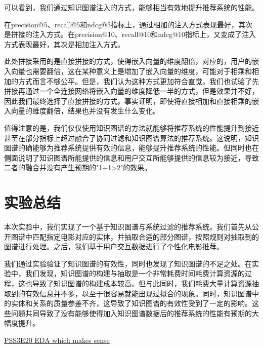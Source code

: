 \documentclass{ctexart}
\begin{document}
\begin{sloppypar}
可以看到，我们通过知识图谱注入的方式，能够相当有效地提升推荐系统的性能。

在precision@5、recall@5和ndcg@5指标上，通过相加的注入方式表现最好，其次是拼接的注入方式。在precision@10、recall@10和ndcg@10指标上，又变成了注入方式表现最好，其次是相加注入方式。

此处拼接采用的是直接拼接的方式，使得嵌入向量的维度翻倍，对应的，用户的嵌入向量也需要翻倍，这在某种意义上是增加了嵌入向量的维度，可能对于相乘和相加的方式而言不够公平。但是，我们认为这种方式更加符合直觉。我们也试验了先拼接再通过一个全连接网络将嵌入向量的维度降低一半的方式，但是效果并不好，因此我们最终选择了直接拼接的方式。事实证明，即使将直接相加和直接相乘的嵌入向量的维度翻倍，结果也并没有发生什么变化。

值得注意的是，我们仅仅使用知识图谱的方法就能够将推荐系统的性能提升到接近甚至在部分指标上超过融合了协同过滤和知识图谱算法的推荐系统。这说明，知识图谱的确能够为推荐系统提供有效的信息，能够提升推荐系统的性能。但同时也在侧面说明了知识图谱所能提供的信息和用户交互所能够提供的信息较为接近，导致二者的融合并没有产生预期的"1+1>2"的效果。

\section{实验总结}
    本次实验中，我们实现了一个基于知识图谱与系统过滤的推荐系统。我们首先从公开图谱中匹配指定电影对应的实体，并抽取合适的部分图谱，按照规则对抽取到的图谱进行处理。之后，我们基于用户交互数据进行了个性化电影推荐。

    我们通过实验验证了知识图谱的有效性，同时也发现了知识图谱的不足之处。在实验中，我们发现，知识图谱的构建与抽取是一个非常耗费时间耗费计算资源的过程，这也导致了知识图谱的构建成本较高。但与此同时，我们耗费大量计算资源抽取到的有效信息并不多，以至于很容易就能出现过拟合的现象。同时，知识图谱中的实体和关系的质量参差不齐，这导致了知识图谱的有效性受到了一定的影响。这些问题共同导致了没有能够使得加入知识图谱数据后的推荐系统的性能有预期的大幅度提升。

    \begin{thebibliography}{100}
        \href{https://www.kaggle.com/code/ambrosm/pss3e20-eda-which-makes-sense}{PSS3E20 EDA which makes sense}
    \end{thebibliography}

\end{sloppypar}
\end{document}

